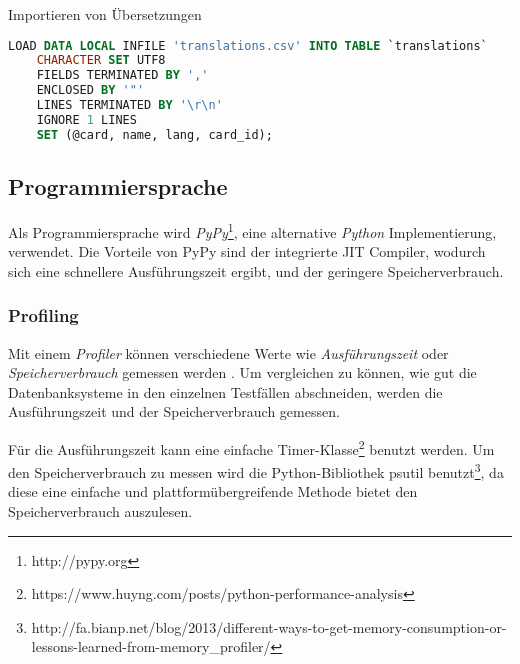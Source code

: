 \begin{listing}[H]
    \caption{Importieren von Übersetzungen}
    \label{listing:sql.import.csv}
    \begin{lstlisting}[language=SQL]
    LOAD DATA LOCAL INFILE 'translations.csv' INTO TABLE `translations`
    CHARACTER SET UTF8
    FIELDS TERMINATED BY ','
    ENCLOSED BY '"'
    LINES TERMINATED BY '\r\n'
    IGNORE 1 LINES
    SET (@card, name, lang, card_id);
    \end{lstlisting}
\end{listing}

\subsection{Programmiersprache}
Als Programmiersprache wird \emph{PyPy}\footnote{http://pypy.org}, eine alternative \emph{Python} Implementierung, verwendet. Die Vorteile von PyPy sind der integrierte \ac{JIT} Compiler, wodurch sich eine schnellere Ausführungszeit ergibt, und der geringere Speicherverbrauch. \cite{doglio2015mastering} 

\subsubsection{Profiling}
Mit einem \emph{Profiler} können verschiedene Werte wie \emph{Ausführungszeit} oder \emph{Speicherverbrauch} gemessen werden \cite{doglio2015mastering}. Um vergleichen zu können, wie gut die Datenbanksysteme in den einzelnen Testfällen abschneiden, werden die Ausführungszeit und der Speicherverbrauch gemessen. 

Für die Ausführungszeit kann eine einfache Timer-Klasse\footnote{https://www.huyng.com/posts/python-performance-analysis} benutzt werden. Um den Speicherverbrauch zu messen wird die Python-Bibliothek psutil benutzt\footnote{http://fa.bianp.net/blog/2013/different-ways-to-get-memory-consumption-or-lessons-learned-from-memory\_profiler/}, da diese eine einfache und plattformübergreifende Methode bietet den Speicherverbrauch auszulesen.
